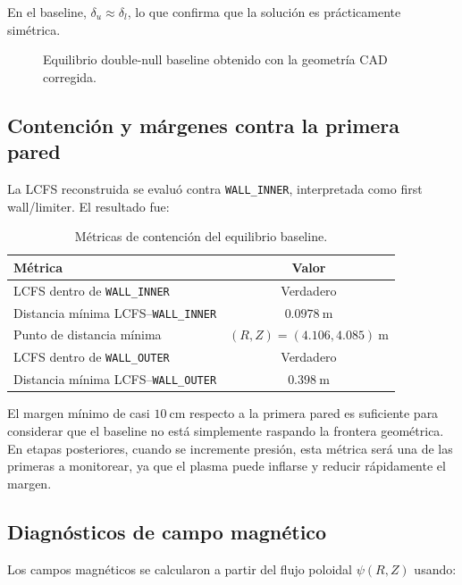\documentclass[11pt,a4paper]{article}
\begin{document}
En el baseline, $\delta_u\approx\delta_l$, lo que confirma que la solución es prácticamente
simétrica.

\begin{figure}[htbp]
\centering
{}
\caption{Equilibrio double-null baseline obtenido con la geometría CAD corregida.}
\label{fig:baseline_equilibrium_clean_placeholder}
\end{figure}

\subsection{Contención y márgenes contra la primera pared}
La LCFS reconstruida se evaluó contra \texttt{WALL\_INNER}, interpretada como first wall/limiter.
El resultado fue:

\begin{table}[htbp]
\centering
\caption{Métricas de contención del equilibrio baseline.}
\label{tab:containment_metrics}
\begin{tabular}{lc}
\toprule
\textbf{Métrica} & \textbf{Valor} \\
\midrule
LCFS dentro de \texttt{WALL\_INNER} & Verdadero \\
Distancia mínima LCFS--\texttt{WALL\_INNER} & $0.0978~\mathrm{m}$ \\
Punto de distancia mínima & $(R,Z)=(4.106,4.085)~\mathrm{m}$ \\
LCFS dentro de \texttt{WALL\_OUTER} & Verdadero \\
Distancia mínima LCFS--\texttt{WALL\_OUTER} & $0.398~\mathrm{m}$ \\
\bottomrule
\end{tabular}
\end{table}

El margen mínimo de casi $10~\mathrm{cm}$ respecto a la primera pared es suficiente para
considerar que el baseline no está simplemente raspando la frontera geométrica. En etapas
posteriores, cuando se incremente presión, esta métrica será una de las primeras a monitorear,
ya que el plasma puede inflarse y reducir rápidamente el margen.

\subsection{Diagnósticos de campo magnético}
Los campos magnéticos se calcularon a partir del flujo poloidal $\psi(R,Z)$ usando:
\end{document}
